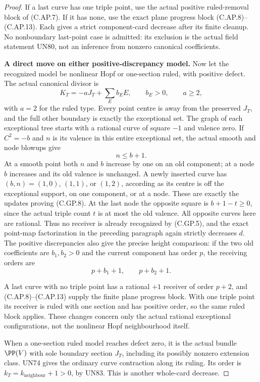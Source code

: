 \begin{proof}
If a last curve has one triple point, use the
actual positive ruled-removal block of (C.AP.7).
If it has none, use the exact plane progress
block (C.AP.8)--(C.AP.13). Each gives a strict
component-card decrease after its finite cleanup.
No nonboundary last-point case is admitted: its
exclusion is the actual field statement UN80,
not an inference from nonzero canonical coefficients.

\par\medskip\noindent\textbf{A direct move on either positive-discrepancy model.}
Now let the recognized model be nonlinear Hopf
or one-section ruled, with positive defect.
The actual canonical divisor is
\[
 K_T=-aJ_T+\sum_E b_EE,
 \qquad b_E>0,
 \qquad a\ge2,
 \tag{C.GP.7}
\]
with \(a=2\) for the ruled type. Every point
centre is away from the preserved \(J_T\),
and the full other boundary is exactly the
exceptional set. The graph of each exceptional
tree starts with a rational curve of square
\(-1\) and valence zero. If \(C^2=-b\) and
\(n\) is its valence in this entire exceptional
set, the actual smooth and node blowups give
\[
                              n\le b+1.
 \tag{C.GP.8}
\]
At a smooth point both \(n\) and \(b\) increase
by one on an old component; at a node \(b\)
increases and its old valence is unchanged.
A newly inserted curve has \((b,n)=(1,0)\),
\((1,1)\), or \((1,2)\), according as its
centre is off the exceptional support, on
one component, or at a node. These are
exactly the updates proving (C.GP.8).
At the last node the opposite
square is \(b+1-t\ge0\), since the actual
triple count \(t\) is at most the old valence.
All opposite curves here are rational.
Thus no receiver is already recognized by
(C.GP.5), and the exact point-map factorization
in the preceding paragraph again strictly
decreases \(d\). The positive discrepancies
also give the precise height comparison:
if the two old coefficients are \(b_1,b_2>0\)
and the current component has order \(p\),
the receiving orders are
\[
                 p+b_1+1,\qquad p+b_2+1.
 \tag{C.GP.9}
\]

A last curve with no triple point has a
rational \(+1\) receiver of order \(p+2\),
and (C.AP.8)--(C.AP.13) supply the finite
plane progress block. With one triple point
its receiver is ruled with one section and
has positive order, so the same ruled block
applies. These changes concern only the
actual rational exceptional configurations,
not the nonlinear Hopf neighbourhood itself.

When a one-section ruled model reaches defect
zero, it is the actual bundle \(\PP(V)\)
with sole boundary section \(J_T\), including
its possibly nonzero extension class. UN74
gives the ordinary curve contraction along
its ruling. Its order is
\(k_T=k_{\mathrm{neighbour}}+1>0\), by UN83.
This is another whole-card decrease.


\end{proof}
